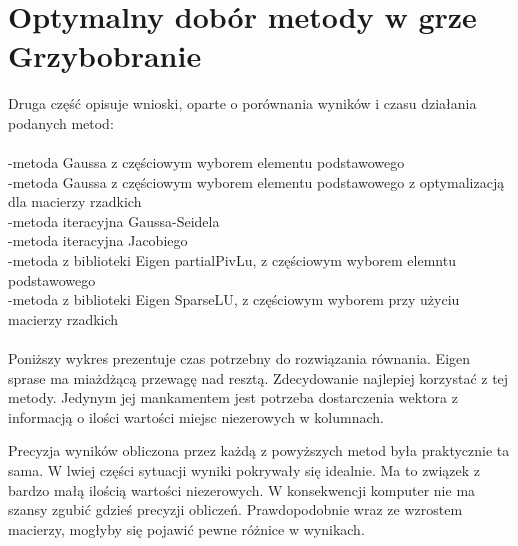 \documentclass[8pt]{article}
\begin{document}
\section*{Optymalny dobór metody w grze Grzybobranie}
Druga część opisuje wnioski, oparte o porównania wyników i czasu działania podanych metod:
\\\\
-metoda Gaussa z częściowym wyborem elementu podstawowego\\
-metoda Gaussa z częściowym wyborem elementu podstawowego z optymalizacją dla macierzy rzadkich\\
-metoda iteracyjna Gaussa-Seidela\\
-metoda iteracyjna Jacobiego\\
-metoda z biblioteki Eigen partialPivLu, z częściowym wyborem elemntu podstawowego\\
-metoda z biblioteki Eigen SparseLU, z częściowym wyborem przy użyciu macierzy rzadkich\\
\\
Poniższy wykres prezentuje czas potrzebny do rozwiązania równania. Eigen sprase ma miażdżącą przewagę nad resztą. Zdecydowanie najlepiej korzystać z tej metody. Jedynym jej mankamentem jest potrzeba dostarczenia wektora z informacją o ilości wartości miejsc niezerowych w kolumnach.
\begin{center}
\end{center}
Precyzja wyników obliczona przez każdą z powyższych metod była praktycznie ta sama. W lwiej części sytuacji wyniki pokrywały się idealnie. Ma to związek z bardzo małą ilością wartości niezerowych. W konsekwencji komputer nie ma szansy zgubić gdzieś precyzji obliczeń. Prawdopodobnie wraz ze wzrostem macierzy, mogłyby się pojawić pewne różnice w wynikach.\\
\end{document}
